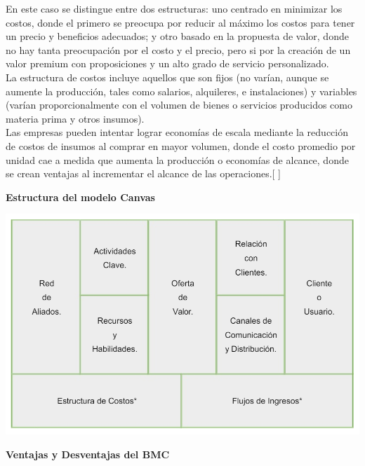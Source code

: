 \documentclass[10pt,a4paper]{article}
\begin{document}
\begin{multicols}{2}
\begin{enumerate}[1.]
			En este caso se distingue entre dos estructuras: uno centrado en minimizar los costos, donde el primero se preocupa por reducir al máximo los costos para tener un precio y beneficios adecuados; y otro basado en la propuesta de valor, donde no hay tanta preocupación por el costo y el precio, pero si por la creación de un valor premium con proposiciones y un alto grado de servicio personalizado.\\
			
			La estructura de costos incluye aquellos que son fijos (no varían, aunque se aumente la producción, tales como salarios, alquileres, e instalaciones) y variables (varían proporcionalmente con el volumen de bienes o servicios producidos como materia prima y otros insumos).\\
			
			Las empresas pueden intentar lograr economías de escala mediante la reducción de costos de insumos al comprar en mayor volumen, donde el costo promedio por unidad cae a medida que aumenta la producción o economías de alcance, donde se crean ventajas al incrementar el alcance de las operaciones.[	]			
		\end{enumerate}
		
		\textbf{Estructura del modelo Canvas}		
		\begin{center}
			\includegraphics[scale=0.30]{./Imagenes/img01}
		\end{center}
		
		\textbf{Ventajas y Desventajas del BMC}
		

\end{multicols}
\end{document}
